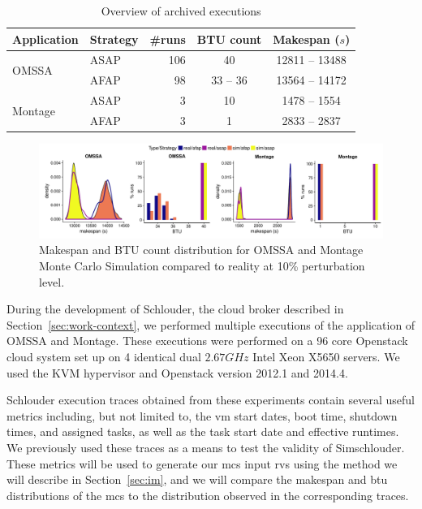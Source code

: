 \documentclass[10pt,conference,compsocconf]{IEEEtran}
\begin{document}
\begin{table} \centering \caption{Overview of archived
	executions}\label{tab:nbruns} 
	\begin{tabular}{llrcc} \toprule
		Application&Strategy&\#runs&BTU count&Makespan ($s$)\\
		\midrule 
		\multirow{2}{*}{OMSSA}&ASAP&106&40&12811 -- 13488\\
				      &AFAP&98&33 -- 36&13564 -- 14172\\ 
		\midrule 
		\multirow{2}{*}{Montage}&ASAP&3&10&1478 -- 1554\\
				        &AFAP&3&1&2833 -- 2837\\
		\bottomrule 
	\end{tabular} 
\end{table}
\begin{figure}
	\includegraphics[width=\textwidth]{gfx/fit_plot.pdf}
	\caption{Makespan and BTU count distribution for OMSSA and Montage Monte
	Carlo Simulation compared to reality at 10\% perturbation
	level.}\label{fig:fit}
\end{figure}


During the development of Schlouder, the cloud broker described in
Section~\ref{sec:work-context}, we performed multiple executions of the
application of OMSSA and Montage. These executions were performed on a 96 core
Openstack cloud system set up on 4 identical dual $2.67GHz$ Intel Xeon X5650
servers. We used the KVM hypervisor and Openstack version 2012.1 and 2014.4.

Schlouder  execution  traces obtained  from  these  experiments contain  several
useful metrics  including, but  not limited  to, the  \ac{vm} start  dates, boot
time, shutdown  times, and assigned  tasks, as well as  the task start  date and
effective  runtimes. We  previously used  these traces  as a  means to  test the
validity of Simschlouder.   These metrics will be used to  generate our \ac{mcs}
input \acp{rv} using the method we will describe in Section~\ref{sec:im}, and we
will compare  the makespan  and \ac{btu}  distributions of  the \ac{mcs}  to the
distribution observed in the corresponding traces.
\end{document}
